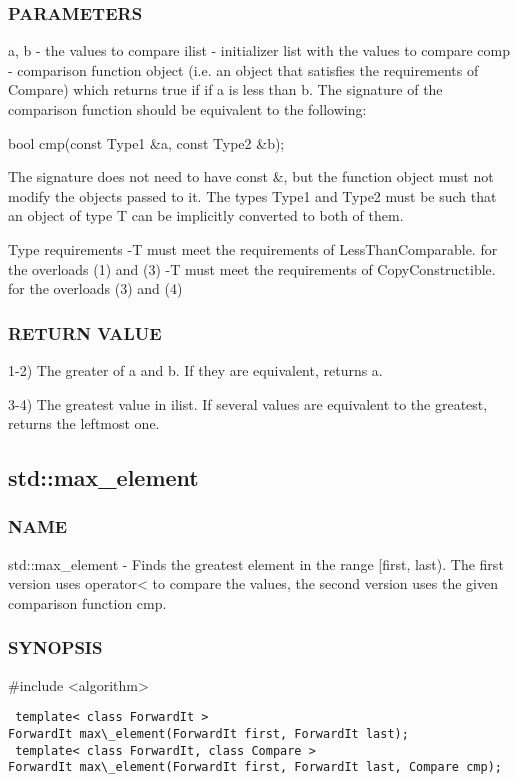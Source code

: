 \subsubsection{PARAMETERS}
a, b - the values to compare
ilist - initializer list with the values to compare
comp - comparison function object (i.e. an object that satisfies the requirements of Compare) which returns true if  if a is less than b.
The signature of the comparison function should be equivalent to the following:

 bool cmp(const Type1 \&a, const Type2 \&b);

The signature does not need to have const \&, but the function object must not modify the objects passed to it.
The types Type1 and Type2 must be such that an object of type T can be implicitly converted to both of them.

 Type requirements
 -T must meet the requirements of LessThanComparable. for the overloads (1) and (3)
 -T must meet the requirements of CopyConstructible. for the overloads (3) and (4)

\subsubsection{RETURN VALUE}
1-2) The greater of a and b. If they are equivalent, returns a.

3-4) The greatest value in ilist. If several values are equivalent to the greatest, returns the leftmost one.



\subsection{std::max\_element}

\subsubsection{NAME}
std::max\_element - Finds the greatest element in the range [first, last). The first version uses operator< to compare the values, the second version uses the given comparison function cmp.

\subsubsection{SYNOPSIS}
\#include <algorithm>

\begin{lstlisting}
 template< class ForwardIt >
ForwardIt max\_element(ForwardIt first, ForwardIt last);
 template< class ForwardIt, class Compare >
ForwardIt max\_element(ForwardIt first, ForwardIt last, Compare cmp);
\end{lstlisting}


